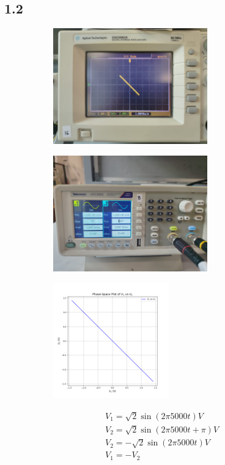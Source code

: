 \documentclass[a4paper,12pt]{article}
\begin{document}
\subsection*{1.2}
\begin{figure}[H]
    \centering
    \begin{subfigure}{0.5\textwidth}
        \centering
        \includegraphics[height=5cm]{figs/2/plot.jpeg}
    \end{subfigure}%
    \begin{subfigure}{0.5\textwidth}
        \centering
        \includegraphics[height=5cm]{figs/2/para.jpeg}
    \end{subfigure}
    \begin{subfigure}{0.5\textwidth}
        \centering
        \includegraphics[height=5cm]{figs/2/pyplot.png}
    \end{subfigure}%
\end{figure}
\begin{align}
    &V_1=\sqrt{2}\sin(2\pi 5000t)V\\
    &V_2=\sqrt{2}\sin(2\pi 5000t+\pi)V\\
    &V_2=-\sqrt{2}\sin(2\pi 5000t)V\\
    &V_1=-V_2
\end{align}
\end{document}
